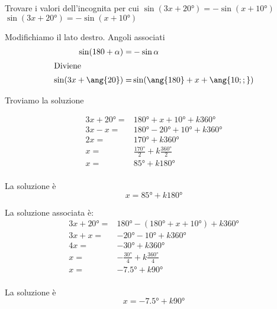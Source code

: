 \begin{exercise}
	Trovare i valori dell'incognita per cui $\sin(3x+\ang{20})=-\sin(x+\ang{10;;})$
	\tcblower
	$\sin(3x+\ang{20})=-\sin(x+\ang{10;;})$
	
Modifichiamo il lato destro. Angoli associati
\begin{align*}
\sin(180+\alpha)=&-\sin\alpha\\
\intertext{Diviene}
\sin(3x+\ang{20})=&\sin(\ang{180}+x+\ang{10;;})
\end{align*}	

	Troviamo la soluzione
	
	\begin{align*}
3x+\ang{20}=&\ang{180}+x+\ang{10}+k\ang{360}\\
3x-x=&\ang{180}-\ang{20}+\ang{10}+k\ang{360}\\
2x=&\ang{170}+k\ang{360}\\
x=&\frac{\ang{170}}{2}+k\frac{\ang{360}}{2}\\
x=&\ang{85}+k\ang{180}\\
	\end{align*}
	
	La soluzione è
	\[x=\ang{85}+k\ang{180}\]
	
La soluzione associata è:
\begin{align*}
3x+\ang{20}=&\ang{180}-(\ang{180}+x+\ang{10})+k\ang{360}\\
3x+x=&- \ang{20}-\ang{10}+k\ang{360}\\
4x=&-\ang{30}+k\ang{360}\\
x=&-\frac{\ang{30}}{4}+k\frac{\ang{360}}{4}\\
x=&-\ang{7.5}+k\ang{90}\\
\end{align*}

La soluzione è
\[x=-\ang{7.5}+k\ang{90}\]
\end{exercise}
